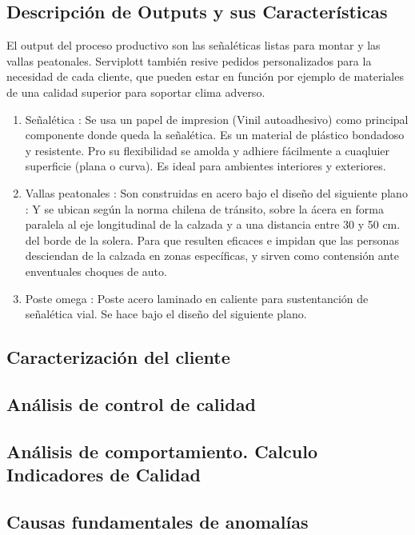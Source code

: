 	\subsection{Descripción de Outputs y sus Características}
	El output del proceso productivo son las señaléticas listas para montar y las vallas peatonales. Serviplott también resive pedidos personalizados para la necesidad de cada cliente, que pueden estar en función por ejemplo de materiales de una calidad superior para soportar clima adverso.
	\begin{enumerate}[1)]
	\item Señalética : Se usa un papel de impresion (Vinil autoadhesivo) como principal componente donde queda la señalética. Es un material de plástico bondadoso y resistente. Pro su flexibilidad se amolda y adhiere fácilmente a cuaqluier superficie (plana o curva). Es ideal para ambientes interiores y exteriores.
	\item Vallas peatonales : Son construidas en acero bajo el diseño del siguiente plano : 
	Y se ubican según la norma chilena de tránsito, sobre la ácera en forma paralela al eje longitudinal de la calzada y a una distancia entre 30 y 50 cm. del borde de la solera. Para que resulten eficaces e impidan que las personas desciendan de la calzada en zonas específicas, y sirven como contensión ante enventuales choques de auto.
	\item Poste omega : Poste acero laminado en caliente para sustentanción de señalética vial. Se hace bajo el diseño del siguiente plano.
	\end{enumerate}
	\subsection{Caracterización del cliente}
	\subsection{Análisis de control de calidad}
	\subsection{Análisis de comportamiento. Calculo Indicadores de Calidad}
	\subsection{Causas fundamentales de anomalías}
